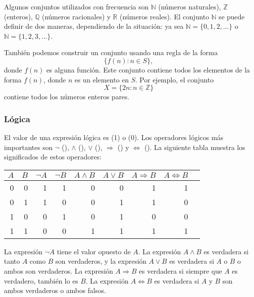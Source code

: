 Algunos conjuntos utilizados con frecuencia son
$\mathbb{N}$ (números naturales),
$\mathbb{Z}$ (enteros),
$\mathbb{Q}$ (números racionales) y
$\mathbb{R}$ (números reales).
El conjunto $\mathbb{N}$
se puede definir de dos maneras, dependiendo
de la situación:
ya sea $\mathbb{N}=\{0,1,2,\ldots\}$
o $\mathbb{N}=\{1,2,3,\ldots\}$.

También podemos construir un conjunto usando una regla de la forma
\[\{f(n) : n \in S\},\]
donde $f(n)$ es alguna función.
Este conjunto contiene todos los elementos de la forma $f(n)$,
donde $n$ es un elemento en $S$.
Por ejemplo, el conjunto
\[X=\{2n : n \in \mathbb{Z}\}\]
contiene todos los números enteros pares.

\subsubsection{Lógica}


El valor de una expresión lógica es
 (1) o  (0).
Los operadores lógicos más importantes son
$\lnot$ (),
$\land$ (),
$\lor$ (),
$\Rightarrow$ () y
$\Leftrightarrow$ ().
La siguiente tabla muestra los significados de estos operadores:

\begin{center}
\begin{tabular}{rr|rrrrrrr}
$A$ & $B$ & $\lnot A$ & $\lnot B$ & $A \land B$ & $A \lor B$ & $A \Rightarrow B$ & $A \Leftrightarrow B$ \\
\hline
0 & 0 & 1 & 1 & 0 & 0 & 1 & 1 \\
0 & 1 & 1 & 0 & 0 & 1 & 1 & 0 \\
1 & 0 & 0 & 1 & 0 & 1 & 0 & 0 \\
1 & 1 & 0 & 0 & 1 & 1 & 1 & 1 \\
\end{tabular}
\end{center}

La expresión $\lnot A$ tiene el valor opuesto de $A$.
La expresión $A \land B$ es verdadera si tanto $A$ como $B$
son verdaderos,
y la expresión $A \lor B$ es verdadera si $A$ o $B$ o ambos
son verdaderos.
La expresión $A \Rightarrow B$ es verdadera
si siempre que $A$ es verdadero, también lo es $B$.
La expresión $A \Leftrightarrow B$ es verdadera
si $A$ y $B$ son ambos verdaderos o ambos falsos.

